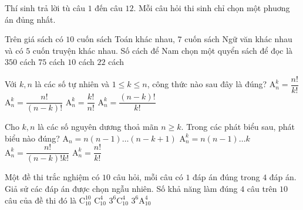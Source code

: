 Thí sinh trả lời tù câu $1$ đến câu $12$. Mỗi câu hỏi thi sinh chỉ chọn một phuơng án đủng nhất.
\begin{ex}%
	Trên giá sách có $10$ cuốn sách Toán khác nhau, $7$ cuốn sách Ngữ văn khác nhau và có $5$ cuốn truyện khác nhau. Số cách để Nam chọn một quyển sách để đọc là
	\choice
	{$350$ cách}
	{$75$ cách}
	{$10$ cách}
	{\True $22$ cách}
\end{ex}
\begin{ex}%
	Với $k, n$ là các số tự nhiên và $1 \leq k \leq n$, công thức nào sau đây là đúng?
	\choice
	{$\mathrm{A}_n^k=\dfrac{n !}{k !}$}
	{\True $\mathrm{A}_n^k=\dfrac{n !}{(n-k) !}$}
	{$\mathrm{A}_n^k=\dfrac{k !}{n !}$}
	{$\mathrm{A}_n^k=\dfrac{(n-k) !}{k !}$}
\end{ex}
\begin{ex}%
	Cho $k, n$ là các số nguyên dương thoả mãn $n \geq k$. Trong các phát biểu sau, phát biểu nào đúng?
	\choice
	{\True $\mathrm{A}_n=n(n-1) \ldots(n-k+1)$}
	{$\mathrm{A}_n^k=n(n-1) \ldots k$}
	{$\mathrm{A}_n^k=\dfrac{n !}{(n-k) ! k !}$}
	{$\mathrm{A}_n^k=\dfrac{n !}{k !}$}
\end{ex}
\begin{ex}%
	Một đề thi trắc nghiệm có $10$ câu hỏi, mỗi câu có $1$ đáp án đúng trong $4$ đáp án. Giả sử các đáp án được chọn ngẫu nhiên. Số khả năng làm đúng $4$ câu trên $10$ câu của đề thi đó là
	\choice
	{$\mathrm{C}_{10}^{10}$}
	{$\mathrm{C}_{10}^4$}
	{\True $3^6 \mathrm{C}_{10}^4$}
	{$3^6 \mathrm{A}_{10}^4$}
\end{ex}

